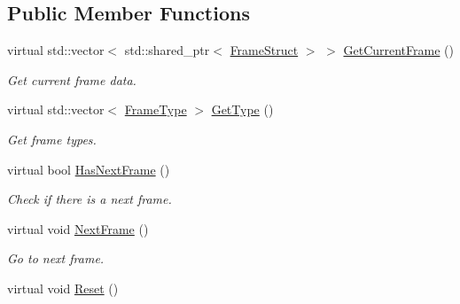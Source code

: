 \subsection*{Public Member Functions}
\begin{DoxyCompactItemize}
\item 
\mbox{\label{classmoetsi_1_1ssp_1_1DummyBodyReader_ab99ceecb1a406a80dbb80a530a0429af}} 
virtual std\+::vector$<$ std\+::shared\+\_\+ptr$<$ \hyperlink{structmoetsi_1_1ssp_1_1FrameStruct}{Frame\+Struct} $>$ $>$ \hyperlink{classmoetsi_1_1ssp_1_1DummyBodyReader_ab99ceecb1a406a80dbb80a530a0429af}{Get\+Current\+Frame} ()
\begin{DoxyCompactList}\small\item\em Get current frame data. \end{DoxyCompactList}\item 
virtual std\+::vector$<$ \hyperlink{namespacemoetsi_1_1ssp_a46efdfa2cd5a28ead465dcc8006b5a87}{Frame\+Type} $>$ \hyperlink{classmoetsi_1_1ssp_1_1DummyBodyReader_a2219d7fd14ca1448fb4c6f2541ac3c9b}{Get\+Type} ()
\begin{DoxyCompactList}\small\item\em Get frame types. \end{DoxyCompactList}\item 
virtual bool \hyperlink{classmoetsi_1_1ssp_1_1DummyBodyReader_ab91b3c2ccdba21bae040340c34361595}{Has\+Next\+Frame} ()
\begin{DoxyCompactList}\small\item\em Check if there is a next frame. \end{DoxyCompactList}\item 
\mbox{\label{classmoetsi_1_1ssp_1_1DummyBodyReader_a3033d6a22bfcf6ffa86de5477372a5cd}} 
virtual void \hyperlink{classmoetsi_1_1ssp_1_1DummyBodyReader_a3033d6a22bfcf6ffa86de5477372a5cd}{Next\+Frame} ()
\begin{DoxyCompactList}\small\item\em Go to next frame. \end{DoxyCompactList}\item 
\mbox{\label{classmoetsi_1_1ssp_1_1DummyBodyReader_ad3334b2dc4730555d90c2a6527a4ca1a}} 
virtual void \hyperlink{classmoetsi_1_1ssp_1_1DummyBodyReader_ad3334b2dc4730555d90c2a6527a4ca1a}{Reset} ()

\end{DoxyCompactItemize}
